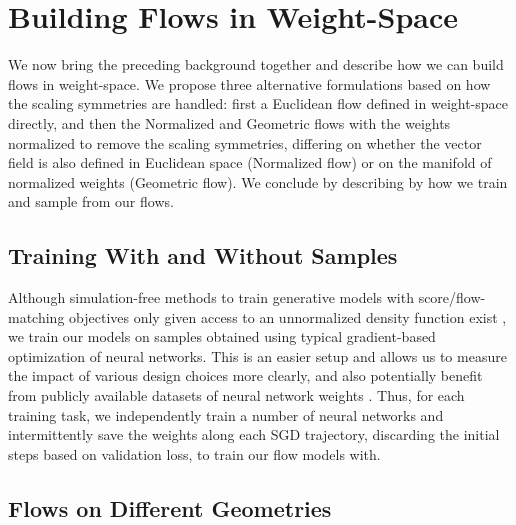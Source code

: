
\chapter{Building Flows in Weight-Space}\label{chapter:method}

We now bring the preceding background together and describe how we can build flows in weight-space. We propose three alternative formulations based on how the scaling symmetries are handled: first a Euclidean flow defined in weight-space directly, and then the Normalized and Geometric flows with the weights normalized to remove the scaling symmetries, differing on whether the vector field is also defined in Euclidean space (Normalized flow) or on the manifold of normalized weights (Geometric flow). We conclude by describing by how we train and sample from our flows. 

\section{Training With and Without Samples}

Although simulation-free methods to train generative models with score/flow-matching objectives only given access to an unnormalized density function exist \citep{akhound-sadeghIteratedDenoisingEnergy2024}, we train our models on samples obtained using typical gradient-based optimization of neural networks. This is an easier setup and allows us to measure the impact of various design choices more clearly, and also potentially benefit from publicly available datasets of neural network weights \citep{schurholtModelZoosDataset2022,peeblesLearningLearnGenerative2022}. Thus, for each training task, we independently train a number of neural networks and intermittently save the weights along each SGD trajectory, discarding the initial steps based on validation loss, to train our flow models with. 

\section{Flows on Different Geometries}

